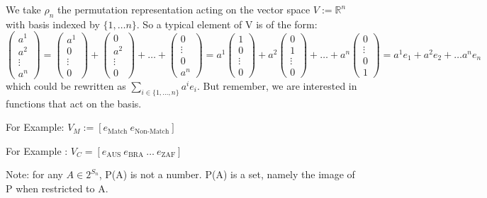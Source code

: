 \documentclass{article}
\theoremstyle{definition}
\begin{document}
We take $\rho_n $ the permutation representation acting on the vector space $V := \mathbb{R}^n$ with basis indexed by $ \{1, \dots n\} $. So a typical element of V is of the form: 
\[ \begin{pmatrix} a^1 \\ a^2 \\ \vdots \\ a^n \end{pmatrix} = \begin{pmatrix} a^1 \\ 0 \\ \vdots \\ 0 \end{pmatrix} + \begin{pmatrix} 0 \\ a^2 \\ \vdots \\ 0 \end{pmatrix} + \dots + \begin{pmatrix} 0 \\  \vdots \\ 0\\ a^n \end{pmatrix} = a^1\begin{pmatrix} 1 \\ 0 \\ \vdots \\ 0 \end{pmatrix} + a^2\begin{pmatrix} 0 \\ 1 \\ \vdots \\ 0 \end{pmatrix} + \dots + a^n\begin{pmatrix} 0 \\  \vdots \\ 0\\ 1\end{pmatrix} = a^1 e_1 + a^2 e_2 + \dots a^n e_n \]
which could be rewritten as $\sum_{i \in \{1,\dots,n\} } a^i e_i$. But remember, we are interested in functions that act on the basis.

For Example: $V_{M} := [ e_{\text{Match}} \: e_{\text{Non-Match}} ]$

For Example  : $V_{C} = [ e_{\text{AUS}} \: e_{\text{BRA}} \: \dots \: e_{\text{ZAF}} ]$




Note: for any $A \in 2^{S_n} $, P(A) is not a number. P(A) is a set, namely the image of P when restricted to A. 
\end{document}
